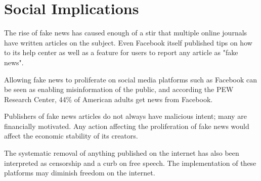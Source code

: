 
\section{Social Implications}


The rise of fake news has caused enough of a stir that multiple online journals have written articles on the subject. \cite{tc_what_is_fake_news,telegraph_fake_news,npr_fake_news} Even Facebook itself published tips on how to its help center \cite{fb_spot_fake_news} as well as a feature for users to report any article as "fake news". \cite{tc_fb_down_ranks_fake_news}

Allowing fake news to proliferate on social media platforms such as Facebook can be seen as enabling misinformation of the public, \cite{tc_facebook_responsibility} and according the PEW Research Center, 44\% of American adults get news from Facebook. \cite{pew_social_media_news} 

Publishers of fake news articles do not always have malicious intent; \cite{cbs_fake_news} many are financially motivated. \cite{fb_addressing_hoaxes} Any action affecting the proliferation of fake news would affect the economic stability of its creators.


The systematic removal of anything published on the internet has also been interpreted as censorship and a curb on free speech. \cite{eff_cali_bill_distrastrous} The implementation of these platforms may diminish freedom on the internet.

